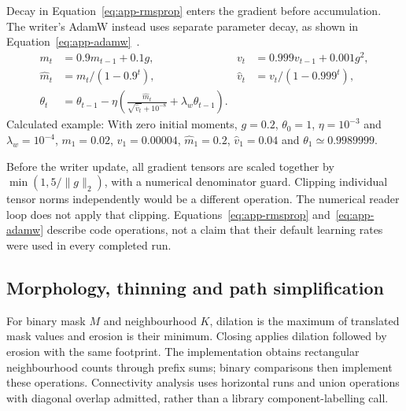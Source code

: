 Decay in Equation~\ref{eq:app-rmsprop} enters the gradient before accumulation. The writer's AdamW instead uses separate parameter decay, as shown in Equation~\ref{eq:app-adamw}~\cite[p.~2, Alg.~1]{kingma2015}\cite[p.~3, Alg.~2]{loshchilov2019}.
\begin{equation}
\begin{aligned}
m_t&=0.9m_{t-1}+0.1g,& v_t&=0.999v_{t-1}+0.001g^2,\\
\widehat m_t&=m_t/(1-0.9^t),&\widehat v_t&=v_t/(1-0.999^t),\\
\theta_t&=\theta_{t-1}-\eta\left(\frac{\widehat m_t}{\sqrt{\widehat v_t}+10^{-8}}+\lambda_w\theta_{t-1}\right).
\end{aligned}
\label{eq:app-adamw}
\end{equation}
Calculated example: With zero initial moments, $g=0.2$, $\theta_0=1$, $\eta=10^{-3}$ and $\lambda_w=10^{-4}$, $m_1=0.02$, $v_1=0.00004$, $\widehat m_1=0.2$, $\widehat v_1=0.04$ and $\theta_1\simeq0.9989999$. \cite[train.py, AdamW]{braunepipeline2026}

Before the writer update, all gradient tensors are scaled together by $\min(1,5/\|g\|_2)$, with a numerical denominator guard. Clipping individual tensor norms independently would be a different operation. The numerical reader loop does not apply that clipping. Equations~\ref{eq:app-rmsprop} and~\ref{eq:app-adamw} describe code operations, not a claim that their default learning rates were used in every completed run.~\cite[train.py; segment.py; style.py]{braunepipeline2026}

\subsection{Morphology, thinning and path simplification}
For binary mask $M$ and neighbourhood $K$, dilation is the maximum of translated mask values and erosion is their minimum. Closing applies dilation followed by erosion with the same footprint. The implementation obtains rectangular neighbourhood counts through prefix sums; binary comparisons then implement these operations. Connectivity analysis uses horizontal runs and union operations with diagonal overlap admitted, rather than a library component-labelling call.~\cite[train.py; segment.py; style.py]{braunepipeline2026}


